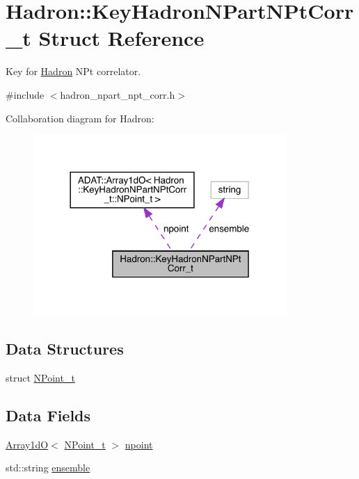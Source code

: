 \hypertarget{structHadron_1_1KeyHadronNPartNPtCorr__t}{}\section{Hadron\+:\+:Key\+Hadron\+N\+Part\+N\+Pt\+Corr\+\_\+t Struct Reference}
\label{structHadron_1_1KeyHadronNPartNPtCorr__t}


Key for \mbox{\hyperlink{namespaceHadron}{Hadron}} N\+Pt correlator.  




{\ttfamily \#include $<$hadron\+\_\+npart\+\_\+npt\+\_\+corr.\+h$>$}



Collaboration diagram for Hadron\+:\nopagebreak
\begin{figure}[H]
\begin{center}
\leavevmode
\includegraphics[width=273pt]{d2/dea/structHadron_1_1KeyHadronNPartNPtCorr__t__coll__graph}
\end{center}
\end{figure}
\subsection*{Data Structures}
\begin{DoxyCompactItemize}
\item 
struct \mbox{\hyperlink{structHadron_1_1KeyHadronNPartNPtCorr__t_1_1NPoint__t}{N\+Point\+\_\+t}}
\end{DoxyCompactItemize}
\subsection*{Data Fields}
\begin{DoxyCompactItemize}
\item 
\mbox{\hyperlink{classADAT_1_1Array1dO}{Array1dO}}$<$ \mbox{\hyperlink{structHadron_1_1KeyHadronNPartNPtCorr__t_1_1NPoint__t}{N\+Point\+\_\+t}} $>$ \mbox{\hyperlink{structHadron_1_1KeyHadronNPartNPtCorr__t_aa2c10fa6d139966599ca71514a4a85a7}{npoint}}
\item 
std\+::string \mbox{\hyperlink{structHadron_1_1KeyHadronNPartNPtCorr__t_a39e829b0115935227246882dee1a2365}{ensemble}}
\end{DoxyCompactItemize}


